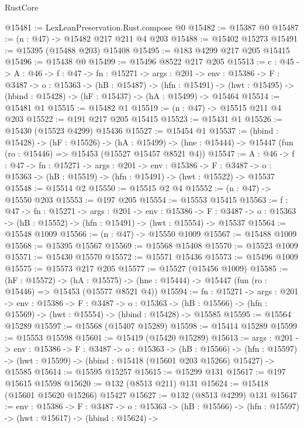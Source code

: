 \begin{lexlean}{RustCore}
\begin{coremodule}
@15481 := LexLeanPreservation.Rust.compose @0
@15482 := @15387 @0
@15487 := (n : @47) -> @15482 @217 @211 @4 @203
@15488 := @15402 @15273
@15491 := @15395 (@15488 @203) @15408
@15495 := @183 @4299 @217 @205 @15415
@15496 := @15438 @0
@15499 := @15496 @8522 @217 @205
@15513 := {c : @45} ->
  {A : @46} ->
  {f : @47} ->
  {fn : @15271} ->
  {args : @201} ->
  {env : @15386} ->
  {F : @3487} ->
  {o : @15363} ->
  (hB : @15487) ->
  (hfn : @15491) -> (hwt : @15495) -> (hbind : @15428) -> (hF : @15437) -> (hA : @15499) -> @15464
@15514 := @15481 @1
@15515 := @15482 @1
@15519 := (n : @47) -> @15515 @211 @4 @203
@15522 := @191 @217 @205 @15415
@15523 := @15431 @1
@15526 := @15430 (@15523 @4299) @15436
@15527 := @15454 @1
@15537 := (hbind : @15428) ->
  (hF : @15526) ->
  (hA : @15499) -> (hne : @15444) -> @15447 (fun (ro : @15446) => @15453 (@15527 @15457 @8521 @4))
@15547 := {A : @46} ->
  {f : @47} ->
  {fn : @15271} ->
  {args : @201} ->
  {env : @15386} ->
  {F : @3487} -> {o : @15363} -> (hB : @15519) -> (hfn : @15491) -> (hwt : @15522) -> @15537
@15548 := @15514 @2
@15550 := @15515 @2 @4
@15552 := (n : @47) -> @15550 @203
@15553 := @197 @205
@15554 := @15553 @15415
@15563 := {f : @47} ->
  {fn : @15271} ->
  {args : @201} ->
  {env : @15386} ->
  {F : @3487} -> {o : @15363} -> (hB : @15552) -> (hfn : @15491) -> (hwt : @15554) -> @15537
@15564 := @15548 @1009
@15566 := (n : @47) -> @15550 @1009
@15567 := @15488 @1009
@15568 := @15395 @15567
@15569 := @15568 @15408
@15570 := @15523 @1009
@15571 := @15430 @15570
@15572 := @15571 @15436
@15573 := @15496 @1009
@15575 := @15573 @217 @205
@15577 := @15527 (@15456 @1009)
@15585 := (hF : @15572) ->
  (hA : @15575) -> (hne : @15444) -> @15447 (fun (ro : @15446) => @15453 (@15577 @8521 @4))
@15594 := {fn : @15271} ->
  {args : @201} ->
  {env : @15386} ->
  {F : @3487} ->
  {o : @15363} -> (hB : @15566) -> (hfn : @15569) -> (hwt : @15554) -> (hbind : @15428) -> @15585
@15595 := @15564 @15289
@15597 := @15568 (@15407 @15289)
@15598 := @15414 @15289
@15599 := @15553 @15598
@15601 := @15419 (@15420 @15289)
@15613 := {args : @201} ->
  {env : @15386} ->
  {F : @3487} ->
  {o : @15363} ->
  (hB : @15566) ->
  (hfn : @15597) -> (hwt : @15599) -> (hbind : @15418 (@15601 @203 @15266) @15427) -> @15585
@15614 := @15595 @15257
@15615 := @15299 @131
@15617 := @197 @15615 @15598
@15620 := @132 (@8513 @211) @131
@15624 := @15418 (@15601 @15620 @15266) @15427
@15627 := @132 (@8513 @4299) @131
@15647 := {env : @15386} ->
  {F : @3487} ->
  {o : @15363} ->
  (hB : @15566) ->
  (hfn : @15597) ->
  (hwt : @15617) ->
  (hbind : @15624) ->

\end{coremodule}
\end{lexlean}
